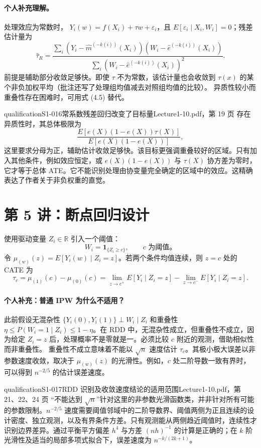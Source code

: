 \paragraph{个人补充理解。}
处理效应为常数时，
$Y_i(w)=f(X_i)+\tau w+\varepsilon_i$，且 $E[\varepsilon_i\mid X_i,W_i]=0$；残差估计量为
\[
\widehat\tau_R=\frac{\sum_i(Y_i-\widehat m^{(-k(i))}(X_i))(W_i-\widehat e^{(-k(i))}(X_i))}
{\sum_i(W_i-\widehat e^{(-k(i))}(X_i))^2}.
\tag{原笔记 4.5}
\]
前提是辅助部分收敛足够快。即使 $\tau$ 不为常数，该估计量也会收敛到 $\tau(x)$ 的某个非负加权平均（批注还写了处理组均值减去对照组均值的比较）。
异质性较小而重叠性存在困难时，可用式 (4.5) 替代。
\begin{reviewnote}{qualification}{S1-016}{常系数残差回归改变了目标量}{Lecture1-10.pdf，第 19 页}
存在异质性时，其总体极限为
\[
\frac{E[e(X)(1-e(X))\tau(X)]}{E[e(X)(1-e(X))]},
\]
这里要求分母为正，辅助估计收敛足够快。该目标更强调重叠较好的区域。只有加入其他条件，例如效应恒定，或 $e(X)(1-e(X))$ 与 $\tau(X)$ 协方差为零时，它才等于总体 ATE。它不能识别处理由协变量完全确定的区域中的效应。这精确表达了作者关于非负权重的直觉。
\end{reviewnote}


\section{第 5 讲：断点回归设计}
使用驱动变量 $Z_i\in\mathbb R$ 引入一个阈值：
\[
W_i=\mathbf1_{\{Z_i\geq c\}},\qquad c\text{ 为阈值。}
\]
令 $\mu_{(w)}(z)=E[Y_i(w)\mid Z_i=z]$。若两个条件均值连续，则 $z=c$ 处的 CATE 为
\[
\tau_c=\mu_{(1)}(c)-\mu_{(0)}(c)
=\lim_{z\to c^+}E[Y_i\mid Z_i=z]-\lim_{z\to c^-}E[Y_i\mid Z_i=z].
\]
\paragraph{个人补充：普通 IPW 为什么不适用？}
此前假设无混杂性 $\{Y_i(0),Y_i(1)\}\perp W_i\mid Z_i$ 和重叠性
$\eta\leq P(W_i=1\mid Z_i)\leq1-\eta$。在 RDD 中，无混杂性成立，但重叠性不成立，因为给定 $Z_i=z$ 后，处理概率不是零就是一。必须比较 $c$ 附近的观测，借助相似性而非重叠性。
重叠性不成立意味着不能以 $\sqrt n$ 速度估计 $\tau_c$。其极小极大误差以非参数速度收敛，取决于 $\mu_{(w)}(z)$ 的光滑性。例如，$c$ 处二阶导数一致有界时，可以得到 $n^{-2/5}$ 的估计误差速度。
\begin{reviewnote}{qualification}{S1-017}{RDD 识别及收敛速度结论的适用范围}{Lecture1-10.pdf，第 21、22、24 页}
“不能达到 $\sqrt n$”针对这里的非参数光滑函数类，并非针对所有可能的参数限制。$n^{-2/5}$ 速度需要阈值邻域中的二阶导数界、阈值两侧为正且连续的设计密度、独立观测，以及有界条件方差。只有观测能从两侧趋近阈值时，连续性才识别边界差异。通过平衡平方偏差 $h^4$ 与方差 $(nh)^{-1}$ 的计算是正确的；在 $k$ 阶光滑性及适当的局部多项式拟合下，误差速度为 $n^{-k/(2k+1)}$。
\end{reviewnote}


